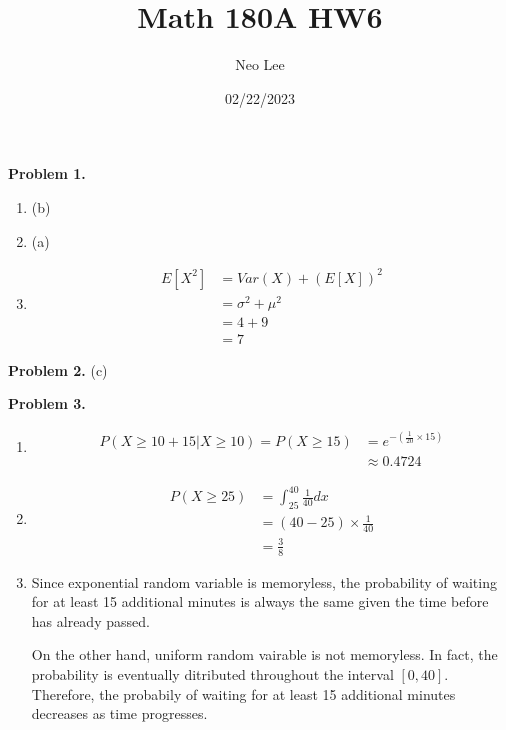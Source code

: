 \documentclass{article}
\title{Math 180A HW6}
\author{Neo Lee}
\date{02/22/2023}
\begin{document}
 

\maketitle 

\textbf{Problem 1.}
\begin{enumerate}
    \item (b)
    \item (a)
    \item 
    \begin{align}
        E[X^2] & = Var(X)+\left(E[X]\right)^2 \\
        & = \sigma^2+\mu^2 \\
        & = 4 + 9 \\
        & = 7
    \end{align}
\end{enumerate}
\bigbreak

\textbf{Problem 2.} (c)
\bigbreak

\textbf{Problem 3.} 
\begin{enumerate}[label={(\alph*)}]
    \item 
    \begin{align}
        P(X\ge 10 + 15|X\ge 10) = P(X\ge 15) & = e^{-(\frac{1}{20}\times 15)} \\
        & \approx 0.4724
    \end{align}

    \item 
    \begin{align}
        P(X \ge 25) & = \int_{25}^{40}\frac{1}{40}dx \\
        & = (40-25) \times \frac{1}{40} \\
        & = \frac{3}{8}
    \end{align}

    \item 
    Since exponential random variable is memoryless, the probability of waiting for at least 15 additional minutes is always the same given the time before has already passed.

    On the other hand, uniform random vairable is not memoryless. In fact, the probability is eventually ditributed throughout the interval $[0,40]$.
    Therefore, the probabily of waiting for at least 15 additional minutes decreases as time progresses.
\end{enumerate}
\pagebreak
\end{document}
